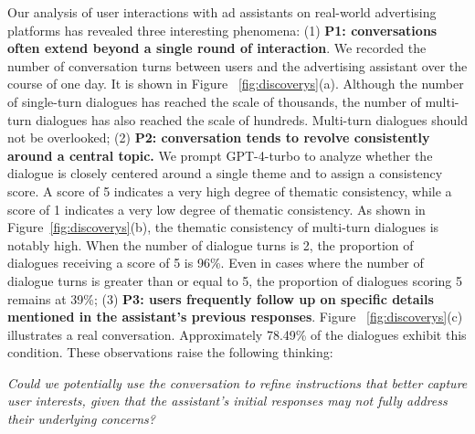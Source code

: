 Our analysis of user interactions with ad assistants on real-world advertising platforms has revealed three interesting phenomena: (1) \textbf{P1: conversations often extend beyond a single round of interaction}. We recorded the number of conversation turns between users and the advertising assistant over the course of one day. It is shown in Figure ~\ref{fig:discoverys}(a). Although the number of single-turn dialogues has reached the scale of thousands, the number of multi-turn dialogues has also reached the scale of hundreds. Multi-turn dialogues should not be overlooked; (2) \textbf{P2: conversation tends to revolve consistently around a central topic.} We prompt GPT-4-turbo to analyze whether the dialogue is closely centered around a single theme and to assign a consistency score. A score of 5 indicates a very high degree of thematic consistency, while a score of 1 indicates a very low degree of thematic consistency. As shown in Figure~\ref{fig:discoverys}(b), the thematic consistency of multi-turn dialogues is notably high. When the number of dialogue turns is 2, the proportion of dialogues receiving a score of 5 is 96\%. Even in cases where the number of dialogue turns is greater than or equal to 5, the proportion of dialogues scoring 5 remains at 39\%; (3) \textbf{P3: users frequently follow up on specific details mentioned in the assistant's previous responses}. Figure ~\ref{fig:discoverys}(c) illustrates a real conversation. Approximately 78.49\% of the dialogues exhibit this condition. These observations raise the following thinking: 

\textit{
Could we potentially use the conversation to refine instructions that better capture user interests, given that the assistant’s initial responses may not fully address their underlying concerns?}



